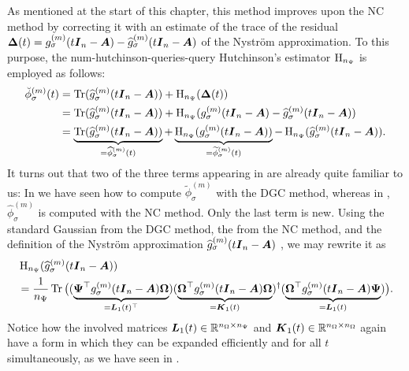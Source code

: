 As mentioned at the start of this chapter, this method improves
upon the \gls{NC} method by correcting it with an estimate of the trace of the
residual $\boldsymbol{\Delta}(t) = g_{\sigma}^{(m)}(t\boldsymbol{I}_n - \boldsymbol{A}) - \widehat{g}_{\sigma}^{(m)}(t\boldsymbol{I}_n - \boldsymbol{A})$
of the Nystr\"om approximation. To this purpose, the \gls{num-hutchinson-queries}-query
Hutchinson's estimator $\operatorname{H}_{n_{\Psi}}$
 is employed as follows:
\begin{align}
    \breve{\phi}_{\sigma}^{(m)}(t)
    &= \operatorname{Tr}(\widehat{g}_{\sigma}^{(m)}(t\boldsymbol{I}_n - \boldsymbol{A}))
    + \operatorname{H}_{n_{\Psi}}(\boldsymbol{\Delta}(t)) \notag \\
    &= \operatorname{Tr}(\widehat{g}_{\sigma}^{(m)}(t\boldsymbol{I}_n - \boldsymbol{A}))
    + \operatorname{H}_{n_{\Psi}}(g_{\sigma}^{(m)}(t\boldsymbol{I}_n - \boldsymbol{A}) - \widehat{g}_{\sigma}^{(m)}(t\boldsymbol{I}_n - \boldsymbol{A})) \notag \\
    &= \underbrace{\operatorname{Tr}(\widehat{g}_{\sigma}^{(m)}(t\boldsymbol{I}_n - \boldsymbol{A}))}_{=\widehat{\phi}_{\sigma}^{(m)}(t)}
    + \underbrace{\operatorname{H}_{n_{\Psi}}(g_{\sigma}^{(m)}(t\boldsymbol{I}_n - \boldsymbol{A}))}_{=\widetilde{\phi}_{\sigma}^{(m)}(t)}
    - \operatorname{H}_{n_{\Psi}}(\widehat{g}_{\sigma}^{(m)}(t\boldsymbol{I}_n - \boldsymbol{A})).
    \label{equ:4-nystromchebyshev-spectral-density-decomposition}
\end{align}
It turns out that two of the three terms appearing in 
are already quite familiar to us: In  we have seen
how to compute $\widetilde{\phi}_{\sigma}^{(m)}$ with the \gls{DGC} method, whereas
in , $\widehat{\phi}_{\sigma}^{(m)}$ is computed with the \gls{NC}
method. Only the last term is new. Using the standard Gaussian 
from the \gls{DGC} method, the  from the \gls{NC} method,
and the definition of the Nystr\"om approximation
$\widehat{g}_{\sigma}^{(m)}(t\boldsymbol{I}_n - \boldsymbol{A})$ ,
we may rewrite it as
\begin{align*}
    &\operatorname{H}_{n_{\Psi}}(\widehat{g}_{\sigma}^{(m)}(t\boldsymbol{I}_n - \boldsymbol{A}))\\
    &=\frac{1}{n_{\Psi}}\operatorname{Tr}\big(
        (\underbrace{\boldsymbol{\Psi}^{\top} g_{\sigma}^{(m)}(t\boldsymbol{I}_n - \boldsymbol{A}) \boldsymbol{\Omega}}_{=\boldsymbol{L}_1(t)^{\top}})
        (\underbrace{\boldsymbol{\Omega}^{\top} g_{\sigma}^{(m)}(t\boldsymbol{I}_n - \boldsymbol{A}) \boldsymbol{\Omega}}_{=\boldsymbol{K}_1(t)})^{\dagger}
        (\underbrace{\boldsymbol{\Omega}^{\top} g_{\sigma}^{(m)}(t\boldsymbol{I}_n - \boldsymbol{A}) \boldsymbol{\Psi}}_{=\boldsymbol{L}_1(t)})
    \big).
\end{align*}
Notice how the involved matrices $\boldsymbol{L}_1(t) \in \mathbb{R}^{n_{\Omega} \times n_{\Psi}}$ and $\boldsymbol{K}_1(t) \in \mathbb{R}^{n_{\Omega} \times n_{\Omega}}$
again have a form in which they can be expanded efficiently and for all $t$ simultaneously,
as we have seen in .\\

